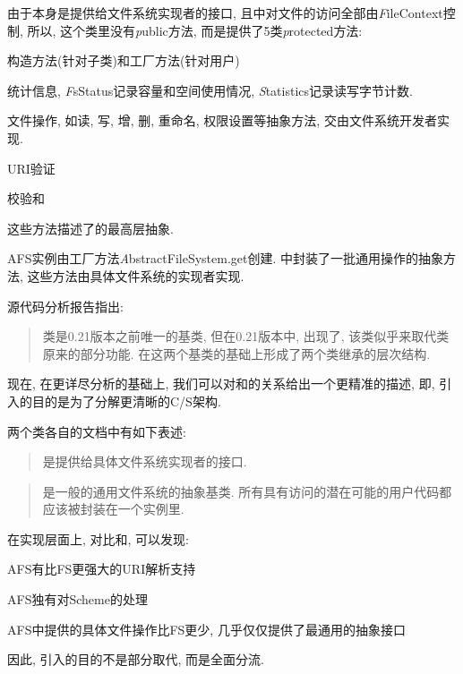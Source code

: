 由于{\AbsFS}本身是提供给文件系统实现者的接口,
且{\HadoopFS}中对文件的访问全部由{\emph FileContext}控制,
所以, 这个类里没有{\emph public}方法, 而是提供了5类{\emph protected}方法:

\begin{XeEnum}
    \item 构造方法(针对子类)和工厂方法(针对用户)
    \item 统计信息, {\emph FsStatus}记录容量和空间使用情况,
          {\emph Statistics}记录读写字节计数.
    \item 文件操作, 如读, 写, 增, 删, 重命名, 权限设置等抽象方法, 交由文件系统开发者实现.
    \item URI验证
    \item 校验和
\end{XeEnum}

这些方法描述了{\HadoopFS}的最高层抽象.

AFS实例由工厂方法{\emph AbstractFileSystem.get}创建.
{\AFS}中封装了一批通用操作的抽象方法, 这些方法由具体文件系统的实现者实现.

{\emph \Hadoop 源代码分析报告}指出:

\begin{quote}
    {\FiS}类是0.21版本之前唯一的基类, 但在0.21版本中, 出现了{\AbsFS},
    该类似乎来取代{\FiS}类原来的部分功能. 在这两个基类的基础上形成了两个类继承的层次结构.
\end{quote}

现在, 在更详尽分析的基础上,
我们可以对{\FiS}和{\AFS}的关系给出一个更精准的描述,
即, 引入{\AFS}的目的是为了分解更清晰的C/S架构.

两个类各自的文档中有如下表述:

\begin{quote}
    {\AbsFS}是提供给具体文件系统实现者的接口.
\end{quote}

\begin{quote}
    {\FiS}是一般的通用文件系统的抽象基类.
    所有具有访问{\HDFS}的潜在可能的用户代码都应该被封装在一个{\FiS}实例里.
\end{quote}

在实现层面上, 对比{\AFS}和{\FS}, 可以发现:

\begin{XeEnum}
    \item AFS有比FS更强大的URI解析支持
    \item AFS独有对Scheme的处理
    \item AFS中提供的具体文件操作比FS更少, 几乎仅仅提供了最通用的抽象接口
    \item 因此, 引入{\AbsFS}的目的不是部分取代, 而是全面分流.
\end{XeEnum}

